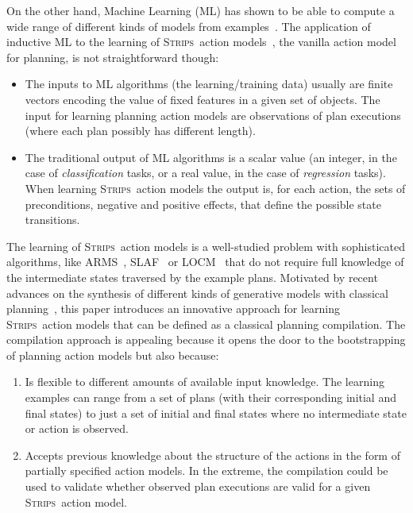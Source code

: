 \documentclass[letterpaper]{article} %
\newcommand{\strips}{\textsc{Strips}}     %
\begin{document}
On the other hand, Machine Learning (ML) has shown to be able to compute a wide range of different kinds of models from examples~\cite{michalski2013machine}. The application of inductive ML to the learning of \strips\ action models~\cite{fikes1971strips}, the vanilla action model for planning, is not straightforward though:
\begin{itemize}
\item The inputs to ML algorithms (the learning/training data) usually are finite vectors encoding the value of fixed features in a given set of objects. The input for learning planning action models are observations of plan executions (where each plan possibly has different length).
\item The traditional output of ML algorithms is a scalar value (an integer, in the case of {\em classification} tasks, or a real value, in the case of {\em regression} tasks). When learning \strips\ action models the output is, for each action, the sets of preconditions, negative and positive effects, that define the possible state transitions.
\end{itemize}

The learning of \strips\ action models is a well-studied problem with sophisticated algorithms, like {\sc ARMS}~\cite{yang2007learning}, {\sc SLAF}~\cite{amir:alearning:JAIR08} or {\sc LOCM}~\cite{cresswell2013acquiring} that do not require full knowledge of the intermediate states traversed by the example plans. Motivated by recent advances on the synthesis of different kinds of generative models with classical planning~\cite{bonet2009automatic,segovia2016hierarchical,segovia2017generating}, this paper introduces an innovative approach for learning \strips\ action models that can be defined as a classical planning compilation. The compilation approach is appealing because it opens the door to the bootstrapping of planning action models but also because:
\begin{enumerate}
\item Is flexible to different amounts of available input knowledge. The learning examples can range from a set of plans (with their corresponding initial and final states) to just a set of initial and final states where no intermediate state  or action is observed.
\item Accepts previous knowledge about the structure of the actions in the form of partially specified action models. In the extreme, the compilation could be used to validate whether observed plan executions are valid for a given \strips\ action model.
\end{enumerate}
\end{document}
